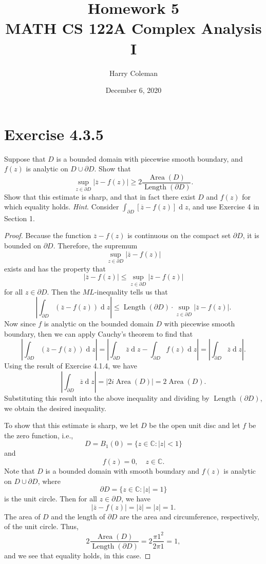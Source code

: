 \documentclass[12pt]{article}
\newenvironment{problem}
    {\begin{lrbox}{\mybox}\begin{minipage}{0.98\textwidth}}
    {\end{minipage}\end{lrbox}\framebox[\textwidth]{\usebox{\mybox}}}
\newcommand{\C}{\mathbb{C}} %
\newcommand{\<}{\left\langle} %
\renewcommand{\>}{\right\rangle} %
\renewcommand{\d}[1]{\operatorname{d}\!#1} %
\let\conj\overline %
\let\bd\partial %
\begin{document}
 
\title{Homework 5\\
    \large MATH CS 122A Complex Analysis I
}
\author{Harry Coleman}
\date{December 6, 2020}
\maketitle

\section{Exercise 4.3.5}
\begin{problem}
    Suppose that $D$ is a bounded domain with piecewise smooth boundary, and $f(z)$ is analytic on $D \cup \bd D$. Show that
    \[\sup_{z \in \bd D}|\conj{z} - f(z)| \geq 2 \frac{\operatorname{Area}(D)}{\operatorname{Length}(\bd D)}.\]
    Show that this estimate is sharp, and that in fact there exist $D$ and $f(z)$ for which equality holds. \emph{Hint}. Consider $\int_{\bd D}[\conj{z} - f(z)]\d{z}$, and use Exercise 4 in Section 1. 
\end{problem}

\begin{proof}
    Because the function $\conj{z} - f(z)$ is continuous on the compact set $\bd D$, it is bounded on $\bd D$. Therefore, the supremum
    \[\sup_{z \in \bd D}|\conj{z} - f(z)|\]
    exists and has the property that
    \[|\conj{z} - f(z)| \leq \sup_{z \in \bd D}|\conj{z} - f(z)|\]
    for all $z \in \bd D$. Then the $ML$-inequality tells us that
    \[\left| \int_{\bd D} (\conj{z} - f(z)) \d{z} \right| \leq \operatorname{Length}(\bd D) \cdot \sup_{z \in \bd D}|\conj{z} - f(z)|.\]
    Now since $f$ is analytic on the bounded domain $D$ with piecewise smooth boundary, then we can apply Cauchy's theorem to find that
    \[\left| \int_{\bd D} (\conj{z} - f(z)) \d{z} \right| = \left| \int_{\bd D} \conj{z} \d{z} - \int_{\bd D} f(z) \d{z} \right| = \left| \int_{\bd D} \conj{z} \d{z} \right|.\]
    Using the result of Exercise 4.1.4, we have
    \[\left| \int_{\bd D} \conj{z} \d{z} \right| = \left| 2i \operatorname{Area}(D) \right| = 2 \operatorname{Area}(D).\]
    Substituting this result into the above inequality and dividing by $\operatorname{Length}(\bd D)$, we obtain the desired inequality.
    
    To show that this estimate is sharp, we let $D$ be the open unit disc and let $f$ be the zero function, i.e.,
    \[D = B_1(0) = \{z \in \C : |z| < 1\}\]
    and
    \[f(z) = 0, \quad z \in \C.\]
    Note that $D$ is a bounded domain with smooth boundary and $f(z)$ is analytic on $D \cup \bd D$, where
    \[\bd D = \{z \in \C : |z| = 1\}\]
    is the unit circle. Then for all $z \in \bd D$, we have
    \[|\conj{z} - f(z)| = |\conj{z}| = |z| = 1.\]
    The area of $D$ and the length of $\bd D$ are the area and circumference, respectively, of the unit circle. Thus,
    \[2\frac{\operatorname{Area}(D)}{\operatorname{Length}(\bd D)} = 2\frac{\pi 1^2}{2 \pi 1} = 1,\]
    and we see that equality holds, in this case.
    
\end{proof}
\end{document}
